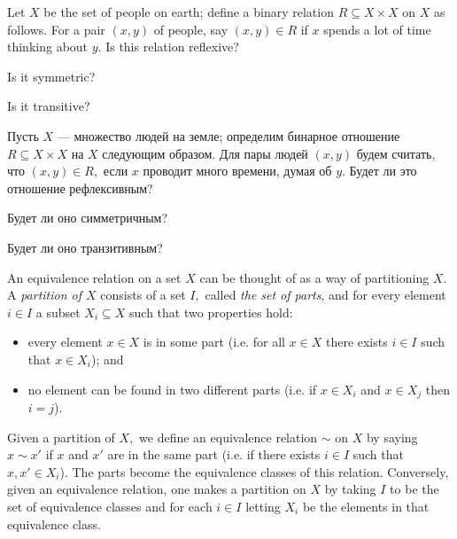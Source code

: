 \documentclass[../main/CT4S-EN-RU]{subfiles}
\begin{document}
\begin{exerciseENG}
Let $X$ be the set of people on earth; define a binary relation $R\subseteq X\times X$ on $X$ as follows. For a pair $(x,y)$ of people, say $(x,y)\in R$ if $x$ spends a lot of time thinking about $y.$ 
\sexc Is this relation reflexive? 
\item Is it symmetric? 
\item Is it transitive?
\endsexc
\end{exerciseENG}

\begin{exerciseRUS}
Пусть $X$ — множество людей на земле; определим бинарное отношение $R\subseteq X\times X$ на $X$ следующим образом. Для пары людей $(x,y)$ будем считать, что $(x,y)\in R,$ если $x$ проводит много времени, думая об $y.$
\sexc Будет ли это отношение рефлексивным? 
\item Будет ли оно симметричным? 
\item Будет ли оно транзитивным?
\endsexc
\end{exerciseRUS}

\begin{exampleENG}[Partitions]\label{ex:partition}
An equivalence relation on a set $X$ can be thought of as a way of partitioning $X.$ A {\em partition of $X$} consists of a set $I,$ called {\em the set of parts}, and for every element $i\in I$ a subset $X_i\subseteq X$ such that two properties hold:
\begin{itemize}
\item every element $x\in X$ is in some part (i.e. for all $x\in X$ there exists $i\in I$ such that $x\in X_i$); and
\item no element can be found in two different parts (i.e. if $x\in X_i$ and $x\in X_j$ then $i=j$).
\end{itemize}

Given a partition of $X,$ we define an equivalence relation $\sim$ on $X$ by saying $x\sim x'$ if $x$ and $x'$ are in the same part (i.e. if there exists $i\in I$ such that $x,x'\in X_i$). The parts become the equivalence classes of this relation. Conversely, given an equivalence relation, one makes a partition on $X$ by taking $I$ to be the set of equivalence classes and for each $i\in I$ letting $X_i$ be the elements in that equivalence class.
\end{exampleENG}
\end{document}
